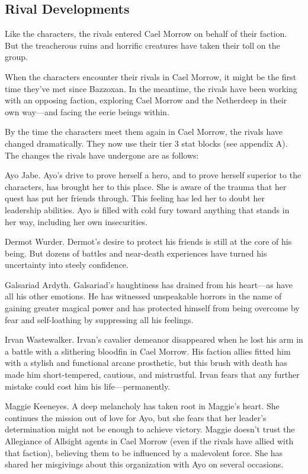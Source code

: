 \documentclass[10pt,a4paper,twoside,bg=print,twocolumn,openany,nodeprecatedcode]{dndbook}
\begin{document}
\subsection{Rival Developments}
Like the characters, the rivals entered Cael Morrow on behalf of their faction. But the treacherous ruins and horrific creatures have taken their toll on the group.

When the characters encounter their rivals in Cael Morrow, it might be the first time they've met since Bazzoxan. In the meantime, the rivals have been working with an opposing faction, exploring Cael Morrow and the Netherdeep in their own way—and facing the eerie beings within.

By the time the characters meet them again in Cael Morrow, the rivals have changed dramatically. They now use their tier 3 stat blocks (see appendix A). The changes the rivals have undergone are as follows:

Ayo Jabe. Ayo's drive to prove herself a hero, and to prove herself superior to the characters, has brought her to this place. She is aware of the trauma that her quest has put her friends through. This feeling has led her to doubt her leadership abilities. Ayo is filled with cold fury toward anything that stands in her way, including her own insecurities.

Dermot Wurder. Dermot's desire to protect his friends is still at the core of his being. But dozens of battles and near-death experiences have turned his uncertainty into steely confidence.

Galsariad Ardyth. Galsariad's haughtiness has drained from his heart—as have all his other emotions. He has witnessed unspeakable horrors in the name of gaining greater magical power and has protected himself from being overcome by fear and self-loathing by suppressing all his feelings.

Irvan Wastewalker. Irvan's cavalier demeanor disappeared when he lost his arm in a battle with a slithering bloodfin in Cael Morrow. His faction allies fitted him with a stylish and functional arcane prosthetic, but this brush with death has made him short-tempered, cautious, and mistrustful. Irvan fears that any further mistake could cost him his life—permanently.

Maggie Keeneyes. A deep melancholy has taken root in Maggie's heart. She continues the mission out of love for Ayo, but she fears that her leader's determination might not be enough to achieve victory. Maggie doesn't trust the Allegiance of Allsight agents in Cael Morrow (even if the rivals have allied with that faction), believing them to be influenced by a malevolent force. She has shared her misgivings about this organization with Ayo on several occasions.
\end{document}
